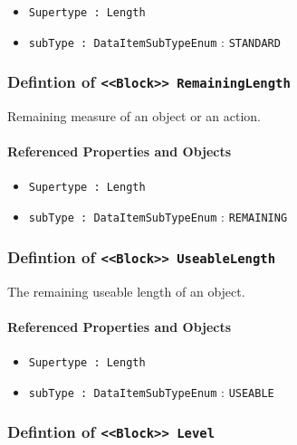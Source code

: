\begin{itemize}
\item \texttt{Supertype : Length}

\item \texttt{subType : DataItemSubTypeEnum} : \texttt{STANDARD}

\end{itemize}
\FloatBarrier
\subsubsection{Defintion of \texttt{<<Block>> RemainingLength}}
  \label{type:RemainingLength}

\FloatBarrier

Remaining measure of an object or an action.

\FloatBarrier
\paragraph{Referenced Properties and Objects}

\begin{itemize}
\item \texttt{Supertype : Length}

\item \texttt{subType : DataItemSubTypeEnum} : \texttt{REMAINING}

\end{itemize}
\FloatBarrier
\subsubsection{Defintion of \texttt{<<Block>> UseableLength}}
  \label{type:UseableLength}

\FloatBarrier

The remaining useable length of an object.

\FloatBarrier
\paragraph{Referenced Properties and Objects}

\begin{itemize}
\item \texttt{Supertype : Length}

\item \texttt{subType : DataItemSubTypeEnum} : \texttt{USEABLE}

\end{itemize}
\FloatBarrier
\subsubsection{Defintion of \texttt{<<Block>> Level}}
  \label{type:Level}

